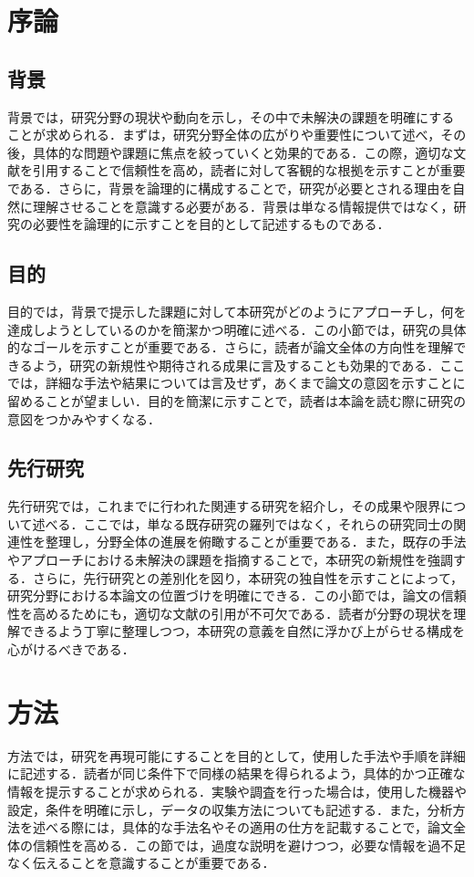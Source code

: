 \documentclass[dvipdfmx]{jsarticle} %
\theoremstyle{definition} %
\begin{document}
\section{序論}
\subsection{背景}
背景では，研究分野の現状や動向を示し，その中で未解決の課題を明確にすることが求められる．まずは，研究分野全体の広がりや重要性について述べ，その後，具体的な問題や課題に焦点を絞っていくと効果的である．この際，適切な文献を引用することで信頼性を高め，読者に対して客観的な根拠を示すことが重要である．さらに，背景を論理的に構成することで，研究が必要とされる理由を自然に理解させることを意識する必要がある．背景は単なる情報提供ではなく，研究の必要性を論理的に示すことを目的として記述するものである．

\subsection{目的}
目的では，背景で提示した課題に対して本研究がどのようにアプローチし，何を達成しようとしているのかを簡潔かつ明確に述べる．この小節では，研究の具体的なゴールを示すことが重要である．さらに，読者が論文全体の方向性を理解できるよう，研究の新規性や期待される成果に言及することも効果的である．ここでは，詳細な手法や結果については言及せず，あくまで論文の意図を示すことに留めることが望ましい．目的を簡潔に示すことで，読者は本論を読む際に研究の意図をつかみやすくなる．

\subsection{先行研究}
先行研究では，これまでに行われた関連する研究を紹介し，その成果や限界について述べる．ここでは，単なる既存研究の羅列ではなく，それらの研究同士の関連性を整理し，分野全体の進展を俯瞰することが重要である．また，既存の手法やアプローチにおける未解決の課題を指摘することで，本研究の新規性を強調する．さらに，先行研究との差別化を図り，本研究の独自性を示すことによって，研究分野における本論文の位置づけを明確にできる．この小節では，論文の信頼性を高めるためにも，適切な文献の引用が不可欠である．読者が分野の現状を理解できるよう丁寧に整理しつつ，本研究の意義を自然に浮かび上がらせる構成を心がけるべきである．

\section{方法}
方法では，研究を再現可能にすることを目的として，使用した手法や手順を詳細に記述する．読者が同じ条件下で同様の結果を得られるよう，具体的かつ正確な情報を提示することが求められる．実験や調査を行った場合は，使用した機器や設定，条件を明確に示し，データの収集方法についても記述する．また，分析方法を述べる際には，具体的な手法名やその適用の仕方を記載することで，論文全体の信頼性を高める．この節では，過度な説明を避けつつ，必要な情報を過不足なく伝えることを意識することが重要である．
\end{document}
